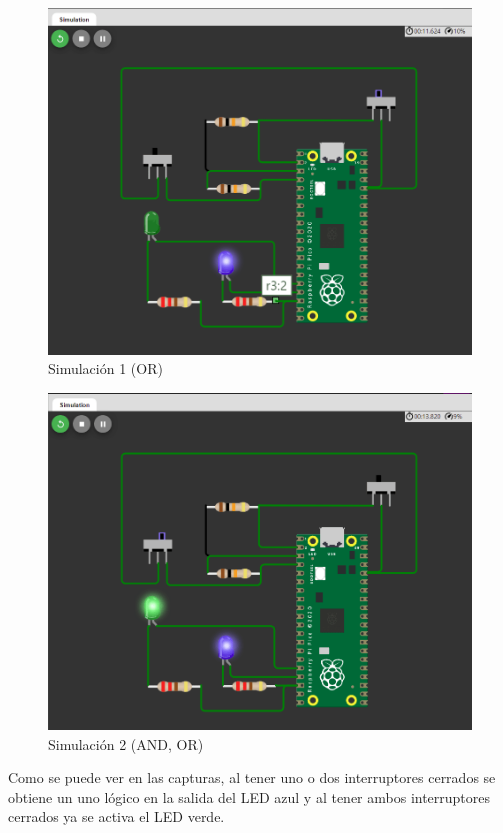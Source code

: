 \documentclass{article}
\begin{document}
    \begin{figure}[H]
        \centering
        \includegraphics[width=0.5\paperwidth]{images/wokwi-example-2-sim-1}
        \caption{Simulación 1 (OR)}
    \end{figure}

    \begin{figure}[H]
        \centering
        \includegraphics[width=0.5\paperwidth]{images/wokwi-example-2-sim-2}
        \caption{Simulación 2 (AND, OR)}
    \end{figure}

    Como se puede ver en las capturas, al tener uno o dos interruptores
    cerrados se obtiene un uno lógico en la salida del LED azul y al tener
    ambos interruptores cerrados ya se activa el LED verde.
\end{document}
